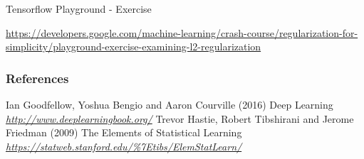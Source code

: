 \begin{frame}{Tensorflow Playground - Exercise}
  \begin{figure}
    \centering
  \end{figure}
  \scriptsize
  \url{https://developers.google.com/machine-learning/crash-course/regularization-for-simplicity/playground-exercise-examining-l2-regularization}
\end{frame}

\begin{vbframe}
\frametitle{References}
\footnotesize{
\begin{thebibliography}{99}
 Ian Goodfellow, Yoshua Bengio and Aaron Courville (2016)
\newblock Deep Learning
\newblock \emph{\url{http://www.deeplearningbook.org/}}
 Trevor Hastie, Robert Tibshirani and Jerome Friedman (2009)
\newblock The Elements of Statistical Learning
\newblock \emph{\url{https://statweb.stanford.edu/\%7Etibs/ElemStatLearn/}}

\end{thebibliography}
}
\end{vbframe}

\endlecture

